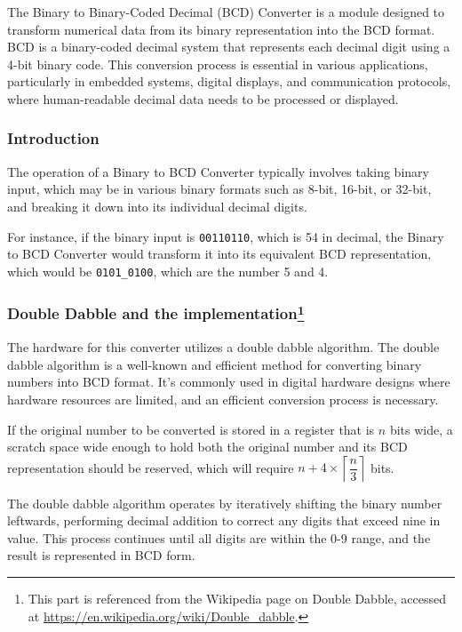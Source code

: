 \documentclass[12pt,a4paper,oneside]{book} %
\begin{document}
The Binary to Binary-Coded Decimal (BCD) Converter is a module designed to transform numerical data from its binary representation into the BCD format. BCD is a binary-coded decimal system that represents each decimal digit using a 4-bit binary code. This conversion process is essential in various applications, particularly in embedded systems, digital displays, and communication protocols, where human-readable decimal data needs to be processed or displayed.

\subsubsection{Introduction}
The operation of a Binary to BCD Converter typically involves taking binary input, which may be in various binary formats such as 8-bit, 16-bit, or 32-bit, and breaking it down into its individual decimal digits.

For instance, if the binary input is \texttt{00110110}, which is 54 in decimal, the Binary to BCD Converter would transform it into its equivalent BCD representation, which would be \texttt{0101\_0100}, which are the number 5 and 4.

\subsubsection{Double Dabble and the implementation\protect\footnote{This part is referenced from the Wikipedia page on Double Dabble, accessed at \url{https://en.wikipedia.org/wiki/Double\_dabble}.\label{footnote 1}}}

The hardware for this converter utilizes a double dabble algorithm. The double dabble algorithm is a well-known and efficient method for converting binary numbers into BCD format. It's commonly used in digital hardware designs where hardware resources are limited, and an efficient conversion process is necessary.

If the original number to be converted is stored in a register that is $n$ bits wide, a scratch space wide enough to hold both the original number and its BCD representation should be reserved, which will require $n + 4\times \left\lceil\dfrac n3\right\rceil$ bits.

The double dabble algorithm operates by iteratively shifting the binary number leftwards, performing decimal addition to correct any digits that exceed nine in value. This process continues until all digits are within the 0-9 range, and the result is represented in BCD form.
\end{document}
